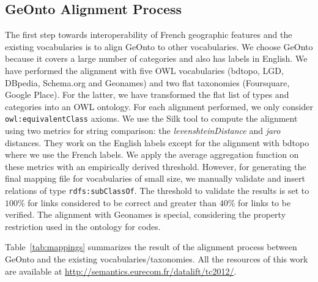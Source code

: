 \documentclass[a4paper,11pt]{report}
\begin{document}
\subsection{GeOnto Alignment Process}
The first step towards interoperability of French geographic features and the existing vocabularies is to align GeOnto to other vocabularies. We choose GeOnto because it covers a large number of categories and also has labels in English. We have performed the alignment with five OWL vocabularies (bdtopo, LGD, DBpedia, Schema.org and Geonames) and two flat taxonomies (Foursquare, Google Place). For the latter, we have transformed the flat list of types and categories into an OWL ontology. For each alignment performed, we only consider \texttt{owl:equivalentClass} axioms. We use the Silk tool \cite{Julius09} to compute the alignment using two metrics for string comparison: the \textit{levenshteinDistance} and \textit{jaro} distances. They work on the English labels except for the alignment with bdtopo where we use the French labels. We apply the average aggregation function on these metrics with an empirically derived threshold. However, for generating the final mapping file for vocabularies of small size, we manually validate and insert relations of type \texttt{rdfs:subClassOf}. The threshold to validate the results is set to $100$\% for links considered to be correct and greater than $40$\% for links to be verified. The alignment with Geonames is special, considering the property restriction used in the ontology for codes.

Table~\ref{tab:mappings} summarizes the result of the alignment process between GeOnto and the existing vocabularies/taxonomies. All the resources of this work are available at \url{http://semantics.eurecom.fr/datalift/tc2012/}.
\begin{table}
\end{table}
\end{document}
